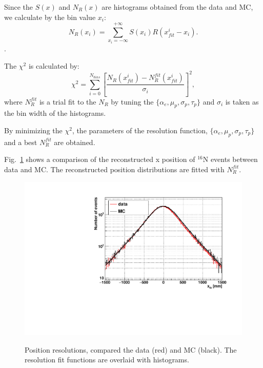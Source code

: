 Since the $S(x)$ and $N_{R}(x)$ are histograms obtained from the data and MC, we calculate by the bin value $x_i$: 
\[N_R(x_i)=\sum_{x_i=-\infty}^{+\infty}S(x_i)R(x_{fit}^i-x_i).\].

The $\chi^2$ is calculated by:
\[
\chi^2=\sum^{N_{bins}}_{i=0}[\frac{N_R(x_{fit}^i)-N_R^{fit}(x_{fit}^i)}{\sigma_i}]^2,
\]
where $N_R^{fit}$ is a trial fit to the $N_R$ by tuning the $\{\alpha_e,\mu_p,\sigma_p,\tau_p\}$ and $\sigma_i$ is taken as the bin width of the histograms.

By minimizing the $\chi^2$, the parameters of the resolution function, $\{\alpha_e,\mu_p,\sigma_p,\tau_p\}$ and a best $N_R^{fit}$ are obtained.

Fig.~\ref{posresol} shows a comparison of the reconstructed x position of {$^{16}$}N events between data and MC. The reconstructed position distributions are fitted with $N_R^{fit}$.


\begin{figure}
	\centering
	\includegraphics[width=140mm]{posResol.pdf}\label{posresol}
	\caption{Position resolutions, compared the data (red) and MC (black). The resolution fit functions are overlaid with histograms.}
\end{figure}

